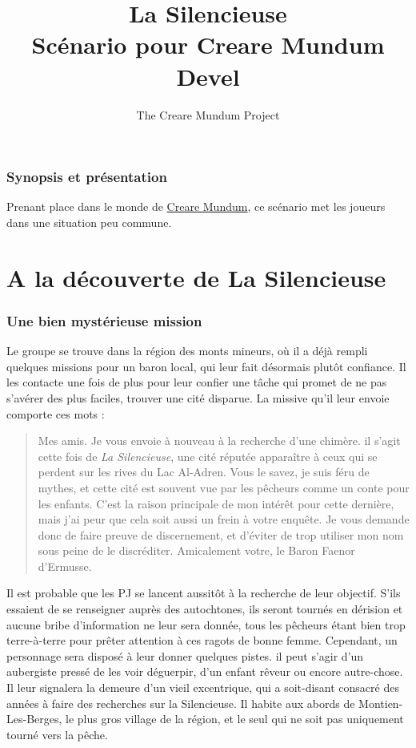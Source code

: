 \documentclass[a4paper, 11pt]{article}
\title{La Silencieuse \\ Scénario pour Creare Mundum \\ Devel}
\author{The Creare Mundum Project}
\date{\oldstylenums{\insertdate}}
\begin{document}
\maketitle
\setcounter{tocdepth}{1} %
\renewcommand{\contentsname}{Sommaire} 
\tableofcontents
\newpage
\section{Synopsis et présentation}
Prenant place dans le monde de {\hyperlink {participation} {Creare Mundum}}, ce scénario met les joueurs dans une situation peu commune. 
\part{A la découverte de La Silencieuse}
\section{Une bien mystérieuse mission}
Le groupe se trouve dans la région des monts mineurs, où il a déjà rempli quelques missions pour un baron local, qui leur fait désormais plutôt confiance. Il les contacte une fois de plus pour leur confier une tâche qui promet de ne pas s'avérer des plus faciles, trouver une cité disparue. La missive qu'il leur envoie comporte ces mots :
\newline
\begin{quotation}
Mes amis. 
\newline
Je vous envoie à nouveau à la recherche d'une chimère. il s'agit cette fois de \textit{La Silencieuse}, une cité réputée apparaître à ceux qui se perdent sur les rives du Lac Al-Adren. Vous le savez, je suis féru de mythes, et cette cité est souvent vue par les pêcheurs comme un conte pour les enfants. C'est la raison principale de mon intérêt pour cette dernière, mais j'ai peur que cela soit aussi un frein à votre enquête. Je vous demande donc de faire preuve de discernement, et d'éviter de trop utiliser mon nom sous peine de le discréditer.
\newline
Amicalement votre, le Baron Faenor d'Ermusse.
\end{quotation}
Il est probable que les PJ se lancent aussitôt à la recherche de leur objectif. S'ils essaient de se renseigner auprès des autochtones, ils seront tournés en dérision et aucune bribe d'information ne leur sera donnée, tous les pêcheurs étant bien trop terre-à-terre pour prêter attention à ces ragots de bonne femme. Cependant, un personnage sera disposé à leur donner quelques pistes. il peut s'agir d'un aubergiste pressé de les voir déguerpir, d'un enfant rêveur ou encore autre-chose. Il leur signalera la demeure d'un vieil excentrique, qui a soit-disant consacré des années à faire des recherches sur la Silencieuse. Il habite aux abords de Montien-Les-Berges, le plus gros village de la région, et le seul qui ne soit pas uniquement tourné vers la pêche. 
\end{document}
